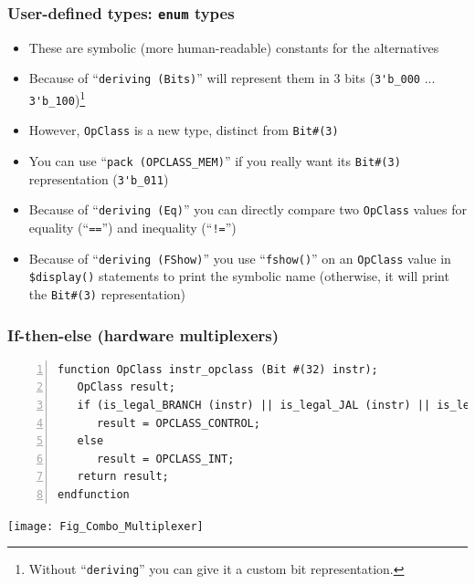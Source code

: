 \begin{frame}[fragile]
\frametitle{User-defined types: {\tt enum} types}

\footnotesize


\vspace{2ex}

\begin{itemize}
 \item These are symbolic (more human-readable) constants for the alternatives

 \item Because of ``\verb|deriving (Bits)|'' {\bsc} will represent
       them in 3 bits (\verb|3'b_000| ... \verb|3'b_100|)\footnote{
       Without ``{\tt deriving}'' you can give it a custom bit representation.}

 \item However, \verb|OpClass| is a new type, distinct from \verb|Bit#(3)|

 \item You can use ``\verb|pack (OPCLASS_MEM)|'' if you really want its
       \verb|Bit#(3)| representation (\verb|3'b_011|)

 \vspace{2ex}

 \item Because of ``\verb|deriving (Eq)|'' you can directly compare
       two \verb|OpClass| values for equality (``\verb|==|'') and
       inequality (``\verb|!=|'')

 \item Because of ``\verb|deriving (FShow)|'' you use
       ``\verb|fshow()|'' on an \verb|OpClass| value in
       \verb|$display()| statements to print the symbolic name
       (otherwise, it will print the \verb|Bit#(3)| representation)

\end{itemize}

\end{frame}


\begin{frame}[fragile]
\frametitle{If-then-else (hardware multiplexers)}

\footnotesize

\begin{Verbatim}[frame=single, numbers=left]
function OpClass instr_opclass (Bit #(32) instr);
   OpClass result;
   if (is_legal_BRANCH (instr) || is_legal_JAL (instr) || is_legal_JALR (instr))
      result = OPCLASS_CONTROL;
   else
      result = OPCLASS_INT;
   return result;
endfunction
\end{Verbatim}

\vspace{2ex}

\begin{center}
 \texttt{[image: Fig\_Combo\_Multiplexer]}
\end{center}

\end{frame}

